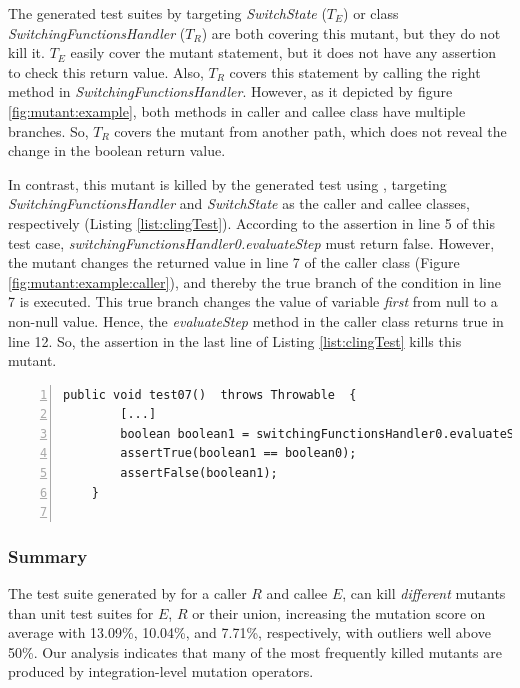 The generated test suites by \evosuite targeting  \textit{SwitchState} ($T_E$) or class \textit{SwitchingFunctionsHandler} ($T_R$) are both covering this mutant, but they do not kill it. 
$T_E$ easily cover the mutant statement, but it does not have any assertion to check this return value.
Also, $T_R$ covers this statement by calling the right method in \textit{SwitchingFunctionsHandler}. However, as it depicted by figure \ref{fig:mutant:example}, both methods in caller and callee class have multiple branches. So, $T_R$ covers the mutant from another path, which does not reveal the change in the boolean return value.

In contrast, this mutant is killed by the generated test using \integration, targeting \textit{SwitchingFunctionsHandler} and \textit{SwitchState} as the caller and callee classes, respectively (Listing \ref{list:clingTest}).
According to the assertion in line 5 of this test case, \textit{switchingFunctionsHandler0.evaluateStep} must return false. However, the mutant changes the returned value in line 7 of the caller class (Figure \ref{fig:mutant:example:caller}), and thereby the true branch of the condition in line 7 is executed. This true branch changes the value of variable \textit{first} from null to a non-null value. Hence, the \textit{evaluateStep} method in the caller class returns true in line 12. So, the assertion in the last line of Listing \ref{list:clingTest} kills this mutant.

\begin{lstlisting}[frame=tb,
    caption={\cling test case killing mutant in Figure~\ref{fig:mutant:example}},
    label=list:clingTest,
    captionpos=t,
    numbers=left,
    float=t,
    belowskip=-2.5em,
    firstnumber=1]
    public void test07()  throws Throwable  {
        [...]
        boolean boolean1 = switchingFunctionsHandler0.evaluateStepC(stepInterpolator0);
        assertTrue(boolean1 == boolean0);
        assertFalse(boolean1);
    }
    
\end{lstlisting}
\subsubsection{Summary}

The test suite generated by \cling for a caller $R$ and callee $E$, can kill \emph{different} mutants than unit test suites for $E$, $R$ or their union, increasing the mutation score on average with 13.09\%, 10.04\%, and 7.71\%, respectively, with outliers well above 50\%.
Our analysis indicates that many of the most frequently killed mutants are produced by integration-level mutation operators.

